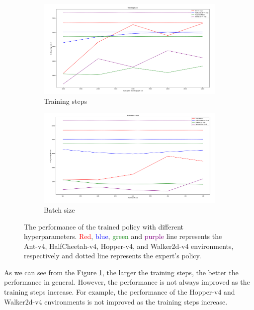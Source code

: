 \documentclass{article}%
\begin{document}
\begin{figure}[!h]
	\centering
	\begin{subfigure}{0.48\textwidth}
		\includegraphics[width=0.9\linewidth, left]{hw1_3_training_steps.png} 
		\caption{Training steps}
		\label{fig:1}
	\end{subfigure}
	\begin{subfigure}{0.48\textwidth}
		\includegraphics[width=0.9\linewidth, right]{hw1_3_train_batch_size.png}
		\caption{Batch size}
		\label{fig:2}
	\end{subfigure}
	\caption{The performance of the trained policy with different hyperparameters. \textcolor{red}{Red}, \textcolor{blue}{blue}, \textcolor{green}{green} and \textcolor{purple}{purple} line represents the Ant-v4, HalfCheetah-v4, Hopper-v4, and Walker2d-v4 environments, respectively and dotted line represents the expert's policy.}
\end{figure}

As we can see from the Figure \ref{fig:1}, the larger the training steps, the better the performance in general. However, the performance is not always improved as the training steps increase. For example, the performance of the Hopper-v4 and Walker2d-v4 environments is not improved as the training steps increase.

\vspace{12pt}
\end{document}
